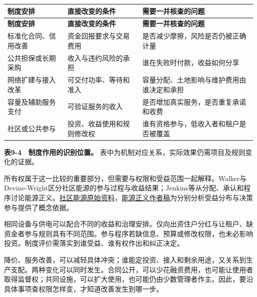 \documentclass[UTF8,fontset=windows,12pt,a4paper,oneside,openany]{ctexbook}
\begin{document}
\begingroup\footnotesize\setlength{\tabcolsep}{4pt}\renewcommand{\arraystretch}{1.25}
\begin{longtable}{>{\raggedright\arraybackslash}p{}>{\raggedright\arraybackslash}p{}>{\raggedright\arraybackslash}p{}}
\toprule
\textbf{制度安排} & \textbf{直接改变的条件} & \textbf{需要一并核查的问题} \\
\midrule\endfirsthead
\toprule
\textbf{制度安排} & \textbf{直接改变的条件} & \textbf{需要一并核查的问题} \\
\midrule\endhead
\bottomrule\endfoot
标准化合同、信用改善 & 资金回报要求与交易费用 & 是否减少摩擦，风险是否仍被正确计量 \\
公共担保或长期采购 & 收入与违约风险的承担 & 谁在失败时付款，收益如何分享 \\
网络扩建与接入改革 & 可交付功率、等待和准入 & 容量分配、土地影响与维护费用由谁决定和承担 \\
容量及辅助服务支付 & 可验证服务的收入 & 是否增加真实服务，是否重复承诺和收费 \\
社区或公共参与 & 投资、收益使用和规则修改权 & 谁有资格参与，低收入者和租户是否被覆盖 \\
\end{longtable}\endgroup


\textbf{表9-4　制度作用的识别位置。} 表中为机制对应关系，实际效果仍需项目及规则变化的证据。

所有权属于这一比较的重要部分，但需要与权限和受益范围一起解释。Walker与Devine-Wright区分社区能源的参与过程与收益结果；Jenkins等从分配、承认和程序讨论能源正义。\href{https://research.manchester.ac.uk/en/publications/community-renewable-energy-what-should-it-mean/}{社区能源原始资料}，\href{https://www.storre.stir.ac.uk/bitstream/1893/23236/1/Energy\%20Justice\%20A\%20Conceptual\%20Review\%20-\%20final\%20pre-pub\%20version.pdf}{能源正义作者稿}为分别分析受益分布与决策参与提供了概念依据。

相同设备与供电可以配合不同的收益和治理安排。仅向出资住户分红与让租户、缺资金者参与规则具有不同范围。参与程序若缺信息、预算或修改权限，也未必影响投资。制度评价需落实到谁受益、谁有权作出和纠正决定。

降价、服务改善，可以减轻具体冲突；谁能定投资、接入和剩余用途，又关系到生产支配。两种变化可以同时发生。合同公开，可以少花融资费用，也可能让使用者取得监督权；共同设施，可以扩大使用，也可能仍由少数管理者作主。因此，要沿具体事项查权限怎样变，才知道改善发生到哪一步。
\end{document}

